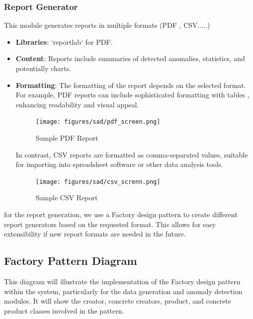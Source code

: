 


\subsubsection{Report Generator}

This module generates reports in multiple formats (PDF , CSV.....)
\begin{itemize}
    \item \textbf{Libraries}: `reportlab` for PDF.
    \item \textbf{Content}: Reports include summaries of detected anomalies, statistics, and potentially charts.
    \item \textbf{Formatting}: The formatting of the report depends on the selected format. For example, PDF reports can include sophisticated formatting with tables , enhancing readability and visual appeal. 

\begin{figure}[H]
    \centering
    \texttt{[image: figures/sad/pdf\_screen.png]}
    \caption{Sample PDF Report}
    \label{fig:pdf_report_screenshot}
\end{figure}

In contrast, CSV reports are formatted as comma-separated values, suitable for importing into spreadsheet software or other data analysis tools. 

\begin{figure}[H]
    \centering
    \texttt{[image: figures/sad/csv\_screnn.png]}
    \caption{Sample CSV Report}
    \label{fig:csv_report_screenshot}
\end{figure}
\end{itemize}

for the report generation, we use a Factory design pattern to create different report generators based on the requested format. This allows for easy extensibility if new report formats are needed in the future.
\subsection{Factory Pattern Diagram}
This diagram will illustrate the implementation of the Factory design pattern within the system, particularly for the data generation and anomaly detection modules. It will show the creator, concrete creators, product, and concrete product classes involved in the pattern.

